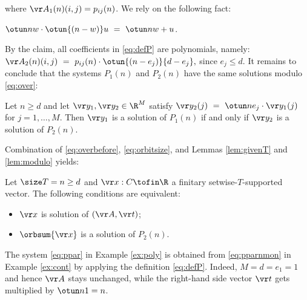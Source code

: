 where $\vr A_1(n)(i,j) = p_{ij}(n)$.
%
We rely on the following fact:
%
\begin{claim} \label{claim:qeq}
$\otun n w \cdot \otun {(n-w)} u \ = \ \otun n {w+u}$. 
\end{claim}
%
\noindent
By the claim, all coefficients in \eqref{eq:defP} are polynomials, namely:
$
{\vr A_2}(n)(i,j) \ = \  p_{ij}(n) \cdot \otun {(n-e_j)} {d-e_j},  %
$
since $e_j \leq d$.
It remains to conclude that the systems $P_1(n)$ and $P_2(n)$ have the same 
solutions modulo \eqref{eq:over}:
%
\begin{lemma} \label{lem:modulo}
Let $n\geq d$ and let 
$\vr y_1, {\vr y_2}\in\R^M$ satisfy 
$
{\vr y_2}(j) \ = \  \otun n {e_j} %
\cdot \vr y_1(j)
$
for $j = 1, \ldots, M$.
Then
$\vr y_1$ is a solution of $P_1(n)$ if and only if \xspace ${\vr y_2}$ is a solution of $P_2(n)$.
\end{lemma}
%
Combination of \eqref{eq:overbefore}, \eqref{eq:orbitsize},
and Lemmas \ref{lem:givenT} and \ref{lem:modulo} yields:
\begin{lemma} \label{lem:givenTT}
Let $\size T = n \geq d$ and $\vr x : C\tofin \R$ a finitary setwise-$T$-supported vector.
The following conditions are equivalent:
\begin{itemize}
\item 
$\vr x$ is solution of $(\vr A, \vr t)$;
\item
$\orbsum {\vr x}$ is a solution of $P_2(n)$.
\end{itemize}
\end{lemma}
%
\begin{slexample} \label{ex:contcont}
The system \eqref{eq:ppar} in Example \ref{ex:poly} is obtained from \eqref{eq:pparnmon}
in Example \ref{ex:cont} by applying the definition \eqref{eq:defP}.
Indeed, $M = d = e_1 = 1$ and hence $\vr A$ stays unchanged, while
the right-hand side vector $\vr t$ gets multiplied by $\otun n 1  = n$.
\end{slexample}


